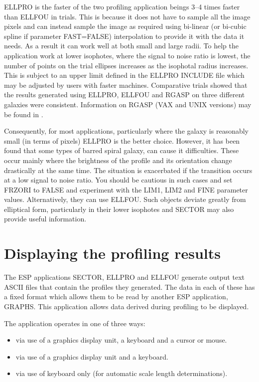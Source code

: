 \documentclass[twoside,11pt]{starlink}
\begin{document}
ELLPRO is the faster of the two profiling application beings 3--4 times
faster than ELLFOU in trials. This is because it does not have to sample
all the image pixels and can instead sample the image as required
using bi-linear (or bi-cubic spline if parameter FAST=FALSE)
interpolation to provide it with the data it needs. As a result it can work
well at both small and large radii. To help the application work at lower
isophotes, where the signal to noise ratio is lowest, the number of
points on the trial ellipses increases as the isophotal
radius increases. This is subject to an upper limit defined in the ELLPRO
INCLUDE file which may be adjusted by users with faster machines.
Comparative trials showed that the results generated using ELLPRO, ELLFOU
and RGASP on three different galaxies were consistent. Information on
RGASP (VAX and UNIX versions) may be found in .

Consequently, for most applications, particularly where the galaxy is
reasonably small (in terms of pixels) ELLPRO is the better choice.
However, it has been found that some types of barred spiral galaxy,
can cause it difficulties. These occur mainly where the brightness of
the profile and its orientation change drastically at the same time.
The situation is exacerbated if the transition occurs at a low signal to
noise ratio. You should be cautious in such cases and set FRZORI to FALSE
and experiment with the LIM1, LIM2 and FINE parameter values. Alternatively,
they can use ELLFOU. Such objects deviate greatly from elliptical form,
particularly in their lower isophotes and SECTOR may also provide useful
information.


\section{Displaying the profiling results}
\label{sec:displaying}

The ESP applications SECTOR, ELLPRO and ELLFOU generate output text
ASCII files that contain the profiles they generated. The data in each of these
has a fixed format which allows them to be read by another ESP application,
GRAPHS. This application allows data derived during profiling to be displayed.

The application operates in one of three ways:

\begin{itemize}
\item via use of a graphics display unit, a keyboard and a cursor or mouse.
\item via use of a graphics display unit and a keyboard.
\item via use of keyboard only (for automatic scale length determinations).
\end{itemize}
\end{document}
